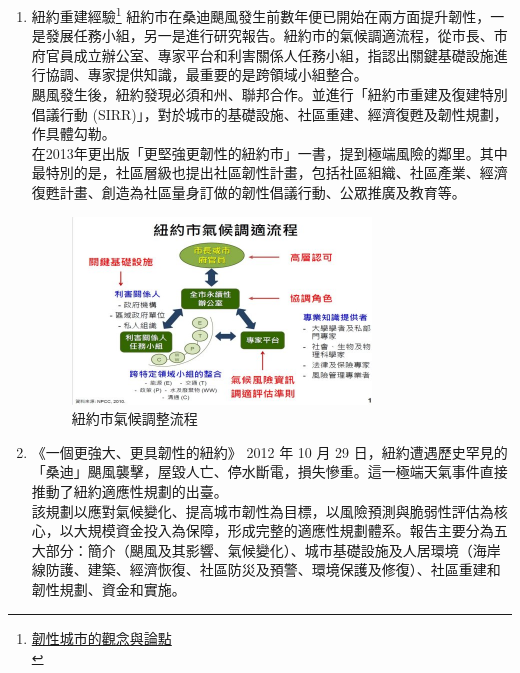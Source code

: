 \documentclass[a4paper,12pt]{article}
\begin{document}
\begin{enumerate}
\item 紐約重建經驗\footnote{\href{http://www.yucc.org.tw/news/domestic/20150302-1}{韌性城市的觀念與論點 }\\}
\label{sec:org5a77980}
紐約市在桑迪颶風發生前數年便已開始在兩方面提升韌性，一是發展任務小組，另一是進行研究報告。紐約市的氣候調適流程，從市長、市府官員成立辦公室、專家平台和利害關係人任務小組，指認出關鍵基礎設施進行協調、專家提供知識，最重要的是跨領域小組整合。\\

颶風發生後，紐約發現必須和州、聯邦合作。並進行「紐約市重建及復建特別倡議行動 (SIRR)」，對於城市的基礎設施、社區重建、經濟復甦及韌性規劃，作具體勾勒。\\

在2013年更出版「更堅強更韌性的紐約市」一書，提到極端風險的鄰里。其中最特別的是，社區層級也提出社區韌性計畫，包括社區組織、社區產業、經濟復甦計畫、創造為社區量身訂做的韌性倡議行動、公眾推廣及教育等。\\

\begin{figure}[htbp]
\centering
\includegraphics[width=300]{images/7d107d045e026c2350198abf90696d417a0b1.jpg}
\caption{\label{fig:NY2}紐約市氣候調整流程}
\end{figure}

\item 《一個更強大、更具韌性的紐約》
\label{sec:org1db60b2}
2012 年 10 月 29 日，紐約遭遇歷史罕見的「桑迪」颶風襲擊，屋毀人亡、停水斷電，損失慘重。這一極端天氣事件直接推動了紐約適應性規劃的出臺。\\

該規劃以應對氣候變化、提高城市韌性為目標，以風險預測與脆弱性評估為核心，以大規模資金投入為保障，形成完整的適應性規劃體系。報告主要分為五大部分：簡介（颶風及其影響、氣候變化）、城市基礎設施及人居環境（海岸線防護、建築、經濟恢復、社區防災及預警、環境保護及修復）、社區重建和韌性規劃、資金和實施。\\


\end{enumerate}
\end{document}

